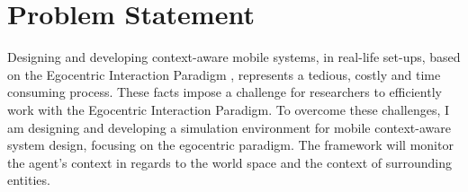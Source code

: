 \section{Problem Statement} %
\label{sec:problem_statement}

Designing and developing context-aware mobile systems, in real-life set-ups, based on the Egocentric Interaction Paradigm \cite{pederson2010towards}, represents a tedious, costly and time consuming process. These facts impose a challenge for researchers to efficiently work with the Egocentric Interaction Paradigm. To overcome these challenges, I am designing and developing a simulation environment for mobile context-aware system design, focusing on the egocentric paradigm. The framework will monitor the agent's context in regards to the world space and the context of surrounding entities.\\

